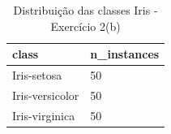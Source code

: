 \begin{table}[htbp]
\centering
\begin{tabular}{ll}
\hline
class & n\_instances \\
\hline
Iris-setosa & 50 \\
Iris-versicolor & 50 \\
Iris-virginica & 50 \\
\hline
\end{tabular}
\caption{Distribuição das classes Iris - Exercício 2(b)}
\label{tab:ex2b-iris-class-distribution}
\end{table}